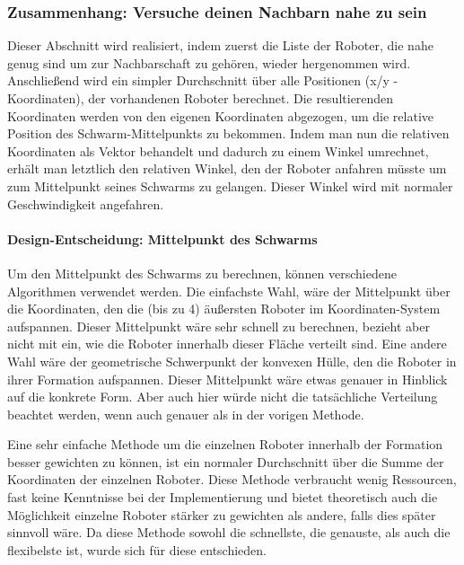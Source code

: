\subsubsection*{Zusammenhang: Versuche deinen Nachbarn nahe zu sein}


Dieser Abschnitt wird realisiert, indem zuerst die Liste der Roboter, die nahe genug sind um zur Nachbarschaft zu gehören, wieder hergenommen wird. Anschließend wird ein simpler Durchschnitt über alle Positionen (x/y - Koordinaten), der vorhandenen Roboter berechnet. Die resultierenden Koordinaten werden von den eigenen Koordinaten abgezogen, um die relative Position des Schwarm-Mittelpunkts zu bekommen. Indem man nun die relativen Koordinaten als Vektor behandelt und dadurch zu einem Winkel umrechnet, erhält man letztlich den relativen Winkel, den der Roboter anfahren müsste um zum Mittelpunkt seines Schwarms zu gelangen. Dieser Winkel wird mit normaler Geschwindigkeit angefahren.

\paragraph*{Design-Entscheidung: Mittelpunkt des Schwarms}
Um den Mittelpunkt des Schwarms zu berechnen, können verschiedene Algorithmen verwendet werden. Die einfachste Wahl, wäre der Mittelpunkt über die Koordinaten, den die (bis zu 4) äußersten Roboter im Koordinaten-System aufspannen. Dieser Mittelpunkt wäre sehr schnell zu berechnen, bezieht aber nicht mit ein, wie die Roboter innerhalb dieser Fläche verteilt sind.
Eine andere Wahl wäre der geometrische Schwerpunkt der konvexen Hülle, den die Roboter in ihrer Formation aufspannen. Dieser Mittelpunkt wäre etwas genauer in Hinblick auf die konkrete Form. Aber auch hier würde nicht die tatsächliche Verteilung beachtet werden, wenn auch genauer als in der vorigen Methode.

Eine sehr einfache Methode um die einzelnen Roboter innerhalb der Formation besser gewichten zu können, ist ein normaler Durchschnitt über die Summe der Koordinaten der einzelnen Roboter. Diese Methode verbraucht wenig Ressourcen, fast keine Kenntnisse bei der Implementierung und bietet theoretisch auch die Möglichkeit einzelne Roboter stärker zu gewichten als andere, falls dies später sinnvoll wäre. Da diese Methode sowohl die schnellste, die genauste, als auch die flexibelste ist, wurde sich für diese entschieden.

